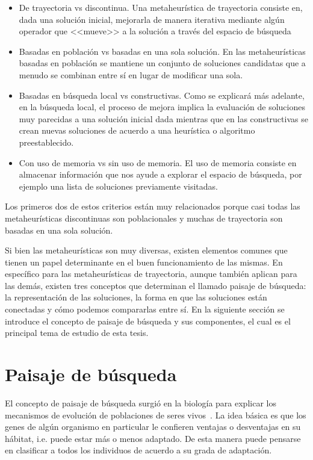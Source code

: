 \begin{itemize}
\item De trayectoria vs discontinua. Una metaheurística de trayectoria consiste en, dada una solución inicial, mejorarla de manera iterativa mediante algún operador que <<mueve>> a la solución a través del espacio de búsqueda %
\item Basadas en población vs basadas en una sola solución. En las metaheurísticas basadas en población se mantiene un conjunto de soluciones candidatas que a menudo se combinan entre sí en lugar de modificar una sola.
\item Basadas en búsqueda local vs constructivas. Como se explicará más adelante, en la búsqueda local, el proceso de mejora implica la evaluación de soluciones muy parecidas a una solución inicial dada mientras que en las constructivas se crean nuevas soluciones de acuerdo a una heurística o algoritmo preestablecido.
\item Con uso de memoria vs sin uso de memoria. El uso de memoria consiste en almacenar información que nos ayude a explorar el espacio de búsqueda, por ejemplo una lista de soluciones previamente visitadas.
\end{itemize} 
Los primeros dos de estos criterios están muy relacionados porque casi todas las metaheurísticas discontinuas son poblacionales y muchas de trayectoria son basadas en una sola solución.


Si bien las metaheurísticas son muy diversas, existen elementos comunes que tienen un papel determinante en el buen funcionamiento de las mismas. 
%
En específico para las metaheurísticas de trayectoria, aunque también aplican para las demás, existen tres conceptos que determinan el llamado paisaje de búsqueda: 
la representación de las soluciones, la forma en que las soluciones están conectadas y cómo podemos compararlas entre sí. 
%
En la siguiente sección se introduce el concepto de paisaje de búsqueda y sus componentes, el cual es el principal tema de estudio de esta tesis.

\section{Paisaje de búsqueda}
El concepto de paisaje de búsqueda surgió en la biología para explicar los mecanismos de evolución de poblaciones de seres vivos~\cite{wright1932roles}. 
%
La idea básica es que los genes de algún organismo en particular le confieren ventajas o desventajas en su hábitat, i.e. puede estar más o menos adaptado. 
%
De esta manera puede pensarse en clasificar a todos los individuos de acuerdo a su grada de adaptación. 

